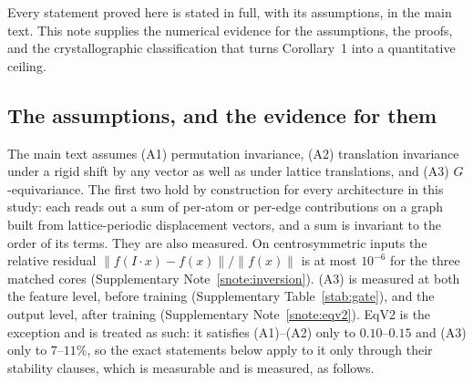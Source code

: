 \setlength{\tabcolsep}{3pt}

\label{snote:proofs}

Every statement proved here is stated in full, with its assumptions, in the main text. This note supplies the numerical evidence for the assumptions, the proofs, and the crystallographic classification that turns Corollary~1 into a quantitative ceiling.

\subsection*{The assumptions, and the evidence for them}

The main text assumes (A1) permutation invariance, (A2) translation invariance under a rigid shift by any vector as well as under lattice translations, and (A3) $G$-equivariance. The first two hold by construction for every architecture in this study: each reads out a sum of per-atom or per-edge contributions on a graph built from lattice-periodic displacement vectors, and a sum is invariant to the order of its terms. They are also measured. On centrosymmetric inputs the relative residual $\lVert f(I\!\cdot\!x)-f(x)\rVert/\lVert f(x)\rVert$ is at most $10^{-6}$ for the three matched cores (Supplementary Note~\ref{snote:inversion}). (A3) is measured at both the feature level, before training (Supplementary Table~\ref{stab:gate}), and the output level, after training (Supplementary Note~\ref{snote:eqv2}). EqV2 is the exception and is treated as such: it satisfies (A1)--(A2) only to $0.10$--$0.15$ and (A3) only to $7$--$11\%$, so the exact statements below apply to it only through their stability clauses, which is measurable and is measured, as follows.

